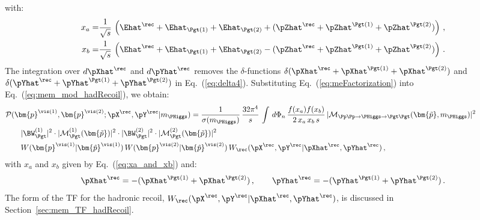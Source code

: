 with:
\begin{align}
x_{a} = & \frac{1}{\sqrt{s}} \, \left( \Ehat^{\rec} + \Ehat_{\Pgt(1)} +
\Ehat_{\Pgt(2)} + (\pZhat^{\rec} + \pZhat^{\Pgt(1)} +
\pZhat^{\Pgt(2)}) \right)
\, , \nonumber \\
x_{b} = & \frac{1}{\sqrt{s}} \, \left( \Ehat^{\rec} + \Ehat_{\Pgt(1)}
  + \Ehat_{\Pgt(2)} - (\pZhat^{\rec} + \pZhat^{\Pgt(1)} +
  \pZhat^{\Pgt(2)}) \right) \, .
\label{eq:xa_and_xb}
\end{align}
The integration over $d\pXhat^{\rec}$ and $d\pYhat^{\rec}$ removes the $\delta$-functions 
$\delta( \pXhat^{\rec} + \pXhat^{\Pgt(1)} + \pXhat^{\Pgt(2)} )$ and
$\delta( \pYhat^{\rec} + \pYhat^{\Pgt(1)} + \pYhat^{\Pgt(2)} )$ in Eq.~(\ref{eq:delta4}).
Substituting Eq.~(\ref{eq:meFactorization}) into Eq.~(\ref{eq:mem_mod_hadRecoil}), we obtain:
\begin{align}
&
\mathcal{P}(\bm{p}^{\vis(1)},\bm{p}^{\vis(2)};\pX^{\rec},\pY^{\rec}|m_{\PHiggs})
= \frac{1}{\sigma(m_{\PHiggs})} \, \frac{32\pi^{4}}{s} \, \int \,
 d\Phi_{n} \, \frac{f(x_{a}) f(x_{b})}{2 \, x_{a} \, x_{b} \, s} \, 
 \vert \mathcal{M}_{\Pp\Pp \to \PHiggs \to \Pgt\Pgt}(\bm{\tilde{p}},m_{\PHiggs}) \vert^{2} \, \hspace{2cm} \nonumber \\
& \qquad \vert \BW^{(1)}_{\Pgt} \vert^{2} \cdot \vert \mathcal{M}^{(1)}_{\Pgt}(\bm{\tilde{p}}) \vert^{2} 
 \cdot \vert \BW^{(2)}_{\Pgt} \vert^{2} \cdot \vert \mathcal{M}^{(2)}_{\Pgt}(\bm{\tilde{p}}) \vert^{2} \, \nonumber \\
& \qquad W(\bm{p}^{\vis(1)}|\bm{\hat{p}}^{\vis(1)}) \, W(\bm{p}^{\vis(2)}|\bm{\hat{p}}^{\vis(2)}) \, W_{\rec}( \pX^{\rec},\pY^{\rec} | \pXhat^{\rec},\pYhat^{\rec} ) \, ,
\label{eq:mem_with_hadRecoil}
\end{align}
with $x_{a}$ and $x_{b}$ given by Eq.~(\ref{eq:xa_and_xb}) and:
\begin{equation}
\pXhat^{\rec} = -(\pXhat^{\Pgt(1)} + \pXhat^{\Pgt(2)}) \, ,
\qquad \pYhat^{\rec} = -(\pYhat^{\Pgt(1)} + \pYhat^{\Pgt(2)}) \, .
\label{eq:xpXhat_and_pYhat}
\end{equation}
The form of the TF for the hadronic recoil, $W_{\rec}( \pX^{\rec},\pY^{\rec} | \pXhat^{\rec},\pYhat^{\rec} )$, is
discussed in Section~\ref{sec:mem_TF_hadRecoil}.

